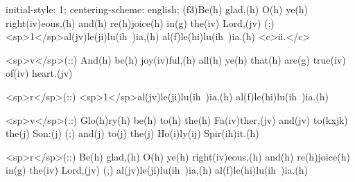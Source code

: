 initial-style: 1;
centering-scheme: english;
(f3)Be(h) glad,(h) O(h) ye(h) right(iv)eous,(h) and(h) re(h)joice(h) in(g) the(iv) Lord,(jv) (;) <sp>1</sp>al(jv)le(ji)lu(ih~)ia,(h) al(f)le(hi)lu(ih~)ia.(h) <c>ii.</c>

<sp>v</sp>(::) And(h) be(h) joy(iv)ful,(h) all(h) ye(h) that(h) are(g) true(iv) of(iv) heart.(jv)

<sp>r</sp>(::) <sp>1</sp>al(jv)le(ji)lu(ih~)ia,(h) al(f)le(hi)lu(ih~)ia.(h)

<sp>v</sp>(::) Glo(h)ry(h) be(h) to(h) the(h) Fa(iv)ther,(jv) and(jv) to(kxjk) the(j) Son:(j) (;) and(j) to(j) the(j) Ho(i)ly(ij) Spir(ih)it.(h)

<sp>r</sp>(::) Be(h) glad,(h) O(h) ye(h) right(iv)eous,(h) and(h) re(h)joice(h) in(g) the(iv) Lord,(jv) (;) al(jv)le(ji)lu(ih~)ia,(h) al(f)le(hi)lu(ih~)ia.(h)